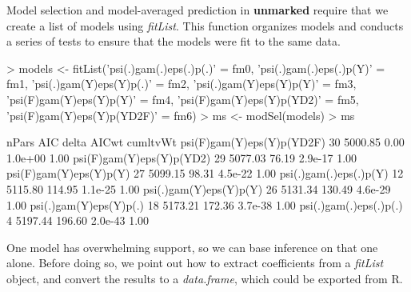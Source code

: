 \documentclass[12pt]{article}
\renewenvironment{Schunk}{\vspace{\topsep}}{\vspace{\topsep}}
\begin{document}
Model selection and model-averaged prediction in \textbf{unmarked}
require that we create a list of models using \emph{fitList}.
This function organizes models and conducts a series of tests to
ensure that the models were fit to the same data.

\begin{small}


\begin{Schunk}
\begin{Sinput}
> models <- fitList('psi(.)gam(.)eps(.)p(.)'    = fm0,
                    'psi(.)gam(.)eps(.)p(Y)'    = fm1,
                    'psi(.)gam(Y)eps(Y)p(.)'    = fm2,
                    'psi(.)gam(Y)eps(Y)p(Y)'    = fm3,
                    'psi(F)gam(Y)eps(Y)p(Y)'    = fm4,
                    'psi(F)gam(Y)eps(Y)p(YD2)'  = fm5,
                    'psi(F)gam(Y)eps(Y)p(YD2F)' = fm6)
> ms <- modSel(models)
> ms
\end{Sinput}
\begin{Soutput}
                          nPars     AIC  delta   AICwt cumltvWt
psi(F)gam(Y)eps(Y)p(YD2F)    30 5000.85   0.00 1.0e+00     1.00
psi(F)gam(Y)eps(Y)p(YD2)     29 5077.03  76.19 2.9e-17     1.00
psi(F)gam(Y)eps(Y)p(Y)       27 5099.15  98.31 4.5e-22     1.00
psi(.)gam(.)eps(.)p(Y)       12 5115.80 114.95 1.1e-25     1.00
psi(.)gam(Y)eps(Y)p(Y)       26 5131.34 130.49 4.6e-29     1.00
psi(.)gam(Y)eps(Y)p(.)       18 5173.21 172.36 3.7e-38     1.00
psi(.)gam(.)eps(.)p(.)        4 5197.44 196.60 2.0e-43     1.00
\end{Soutput}
\end{Schunk}

\end{small}



One model has overwhelming support, so we can base inference on that
one alone. Before doing so, we point out how to extract coefficients
from a \emph{fitList} object, and convert the results to a
\emph{data.frame}, which could be exported from R.
\end{document}
